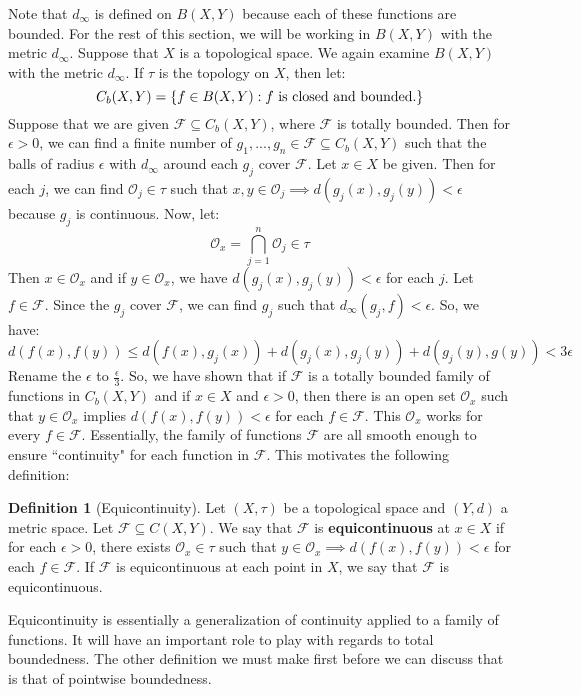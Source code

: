 \documentclass[11pt, oneside]{amsart}   	%
\theoremstyle{definition}
\newtheorem{definition}{Definition}[section]
\begin{document}
	Note that $d_\infty$ is defined on $B(X, Y)$ because each of these functions are bounded. For the rest of this section, 
	we will be working in $B(X, Y)$ with the metric $d_\infty$. Suppose that $X$ is a topological space. We again examine 
	$B(X, Y)$ with the metric $d_\infty$. If $\tau$ is the topology on $X$, then let:
	$$
		C_b(X, Y) = \{f \in B(X, Y) : f \textnormal{ is closed and bounded.}\}
	$$
	Suppose that we are given $\mathcal F\subseteq C_b(X, Y)$, where $\mathcal F$ is totally bounded. Then for $\epsilon 
	> 0$, we can find a finite number of $g_1, ..., g_n\in \mathcal F\subseteq C_b(X, Y)$ such that the balls of radius 
	$\epsilon$ with $d_\infty$ around each $g_j$ cover $\mathcal F$. Let $x\in X$ be given. Then for each $j$, we 
	can find $\mathcal O_j\in\tau$ such that $x, y\in\mathcal O_j\implies d(g_j(x), g_j(y)) < \epsilon$ because $g_j$ is 
	continuous. Now, let:
	$$
		\mathcal O_x = \bigcap_{j = 1}^n\mathcal O_j\in\tau
	$$
	Then $x\in \mathcal O_x$ and if $y\in\mathcal O_x$, we have $d(g_j(x), g_j(y)) < \epsilon$ for each $j$. Let $f\in
	\mathcal F$. Since the $g_j$ cover $\mathcal F$, we can find $g_j$ such that $d_\infty(g_j, f) < \epsilon$. So, we 
	have:
	$$
		d(f(x), f(y)) \leq d(f(x), g_j(x)) + d(g_j(x), g_j(y)) + d(g_j(y), g(y)) < 3\epsilon
	$$
	Rename the $\epsilon$ to $\frac{\epsilon}{3}$. So, we have shown that if $\mathcal F$ is a totally bounded family 
	of functions in $C_b(X, Y)$ and if $x\in X$ and $\epsilon > 0$, then there is an open set $\mathcal O_x$ such 
	that $y\in \mathcal O_x$ implies $d(f(x), f(y)) < \epsilon$ for each $f\in\mathcal F$. This $\mathcal O_x$ works for 
	every $f\in\mathcal F$. Essentially, the family of functions $\mathcal F$ are all smooth enough to ensure ``continuity" 
	for each function in $\mathcal F$. This motivates the following definition:
	
	\begin{definition}[Equicontinuity]
		Let $(X, \tau)$ be a topological space and $(Y, d)$ a metric space. Let $\mathcal F\subseteq C(X, Y)$. We say that 
		$\mathcal F$ is \textbf{equicontinuous} at $x\in X$ if for each $\epsilon > 0$, there exists $\mathcal O_x\in\tau$ 
		such that $y\in\mathcal O_x\implies d(f(x), f(y)) < \epsilon$ for each $f\in\mathcal F$. If $\mathcal F$ is 
		equicontinuous at each point in $X$, we say that $\mathcal F$ is equicontinuous.
	\end{definition}
	
	Equicontinuity is essentially a generalization of continuity applied to a family of functions. It will have an important role 
	to play with regards to total boundedness. The other definition we must make first before we can discuss that is that 
	of pointwise boundedness.
	
\end{document}
